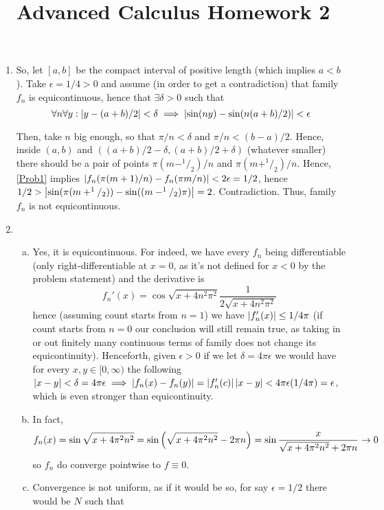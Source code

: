 \documentclass[10pt]{article} %
\title{Advanced Calculus Homework 2}
\author{}
\begin{document}
\maketitle
\begin{enumerate}[(1)]
	\item So, let $[a,b]$ be the compact interval of positive length (which implies $a<b$). Take $\epsilon=1/4>0$ and assume
		(in order to get a contradiction) that family $f_n$ is equicontinuous, hence that $\exists\delta>0$ such that 
		\begin{equation}\forall n\forall y:\left|y-(a+b)/2\right|<\delta\implies
			\left|\sin(ny)-\sin(n(a+b)/2)\right|<\epsilon\label{Prob1}\end{equation}
		
		Then, take $n$ big enough, so that $\pi/n<\delta$ and $\pi/n<(b-a)/2$. Hence, inside $(a,b)$ and $((a+b)/2-\delta,
		(a+b)/2+\delta)$ (whatever smaller) there should be a pair of points $\pi (m-^1/_2)/n$ and $\pi(m+^1/_2)/n$. Hence, 
		\ref{Prob1} implies $\left|f_n(\pi(m+1)/n)-f_n(\pi m/n)\right|<2\epsilon=1/2$, hence
		$1/2>\left|\sin(\pi(m+^1/_2))-\sin((m-^1/_2)\pi)\right|=2$. Contradiction. Thus, family $f_n$ is not equicontinuous.
	\setcounter{enumi}{3}
\item\begin{enumerate}[(a)]
		\item Yes, it is equicontinuous. For indeed, we have every $f_n$ being differentiable (only right-differentiable at 
			$x=0$, as it's not defined for $x<0$ by the problem statement) and the derivative is
			\[f_n'(x)=\cos\sqrt{x+4n^2\pi^2}\frac{1}{2\sqrt{x+4n^2\pi^2}}\]
			hence (assuming count starts from $n=1$) we have $\left|f_n'(x)\right|\leq1/4\pi$ (if count starts from $n=0$
			our conclusion will still remain true, as taking in or out finitely many continuous
			terms of family does not change its equicontinuity). Henceforth, given $\epsilon>0$ if we let
		$\delta=4\pi\epsilon$ we would have for every $x,y\in[0,\infty)$ the following
			$\left|x-y\right|<\delta=4\pi\epsilon\implies\left|f_n(x)-f_n(y)\right|=\left|f_n'(c)\right|\left|x-y\right|<4\pi\epsilon(1/4\pi)
			=\epsilon$, which is even stronger than equicontinuity.
		\item In fact, \[f_n(x)=\sin\sqrt{x+4\pi^2n^2}=\sin\left(\sqrt{x+4\pi^2n^2}-2\pi n\right)=
			\sin\frac{x}{\sqrt{x+4\pi^2n^2}+2\pi n}\to0\]
			so $f_n$ do converge pointwise to $f\equiv0$.
		\item Convergence is not uniform, as if it would be so, for say $\epsilon=1/2$ there would be $N$ such that
		\begin{equation}

\end{equation}
\end{enumerate}
\end{enumerate}
\end{document}
